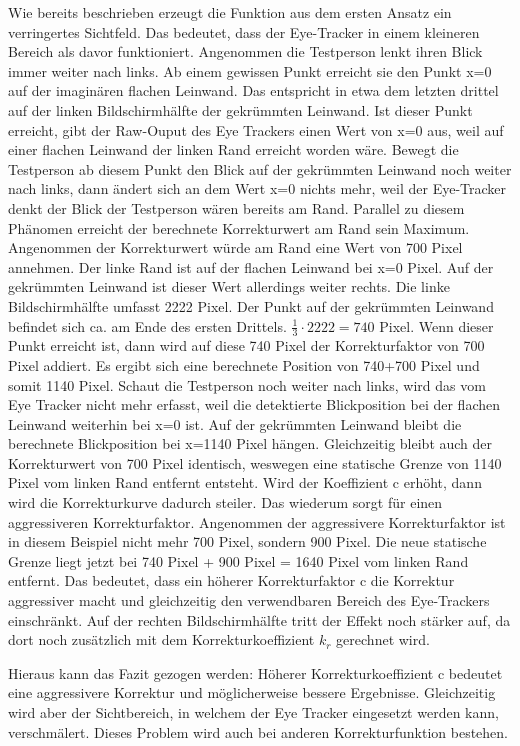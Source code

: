 Wie bereits beschrieben erzeugt die Funktion aus dem ersten Ansatz ein verringertes Sichtfeld. Das bedeutet, dass der Eye-Tracker in einem kleineren Bereich als davor funktioniert. Angenommen die Testperson lenkt ihren Blick immer weiter nach links. Ab einem gewissen Punkt erreicht sie den Punkt x=0 auf der imaginären flachen Leinwand. Das entspricht in etwa dem letzten drittel auf der linken Bildschirmhälfte der gekrümmten Leinwand. Ist dieser Punkt erreicht, gibt der Raw-Ouput des Eye Trackers einen Wert von x=0 aus, weil auf einer flachen Leinwand der linken Rand erreicht worden wäre. Bewegt die Testperson ab diesem Punkt den Blick auf der gekrümmten Leinwand noch weiter nach links, dann ändert sich an dem Wert x=0 nichts mehr, weil der Eye-Tracker denkt der Blick der Testperson wären bereits am Rand. Parallel zu diesem Phänomen erreicht der berechnete Korrekturwert am Rand sein Maximum. Angenommen der Korrekturwert würde am Rand eine Wert von 700 Pixel annehmen. Der linke Rand ist auf der flachen Leinwand bei x=0 Pixel. Auf der gekrümmten Leinwand ist dieser Wert allerdings weiter rechts. Die linke Bildschirmhälfte umfasst 2222 Pixel. Der Punkt auf der gekrümmten Leinwand befindet sich ca. am Ende des ersten Drittels. $\frac{1}{3} \cdot 2222 = 740$ Pixel. Wenn dieser Punkt erreicht ist, dann wird auf diese 740 Pixel der Korrekturfaktor von 700 Pixel addiert. Es ergibt sich eine berechnete Position von 740+700 Pixel und somit 1140 Pixel. Schaut die Testperson noch weiter nach links, wird das vom Eye Tracker nicht mehr erfasst, weil die detektierte Blickposition bei der flachen Leinwand weiterhin bei x=0 ist. Auf der gekrümmten Leinwand bleibt die berechnete Blickposition bei x=1140 Pixel hängen. Gleichzeitig bleibt auch der Korrekturwert von 700 Pixel identisch, weswegen eine statische Grenze von 1140 Pixel vom linken Rand entfernt entsteht. Wird der Koeffizient c erhöht, dann wird die Korrekturkurve dadurch steiler. Das wiederum sorgt für einen aggressiveren Korrekturfaktor. Angenommen der aggressivere Korrekturfaktor ist in diesem Beispiel nicht mehr 700 Pixel, sondern 900 Pixel. Die neue statische Grenze liegt jetzt bei 740 Pixel + 900 Pixel = 1640 Pixel vom linken Rand entfernt. Das bedeutet, dass ein höherer Korrekturfaktor c die Korrektur aggressiver macht und gleichzeitig den verwendbaren Bereich des Eye-Trackers einschränkt. Auf der rechten Bildschirmhälfte tritt der Effekt noch stärker auf, da dort noch zusätzlich mit dem Korrekturkoeffizient $k_r$ gerechnet wird. 


Hieraus kann das Fazit gezogen werden: Höherer Korrekturkoeffizient c bedeutet eine aggressivere Korrektur und möglicherweise bessere Ergebnisse. Gleichzeitig wird aber der Sichtbereich, in welchem der Eye Tracker eingesetzt werden kann, verschmälert. Dieses Problem wird auch bei anderen Korrekturfunktion bestehen. 



